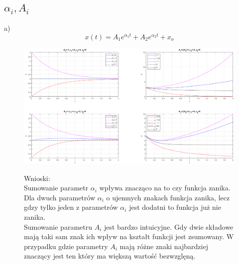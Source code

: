 \documentclass{article}
\begin{document}
\subsection{$\alpha_i,A_i$}
a)
$$
x(t)=A_1e^{\alpha_1 t}+A_2e^{\alpha_2 t} + x_o
$$
\begin{figure}[h]
    \centering
    \includegraphics[width=1.15\textwidth]{c_graphs_wersja2.png}
    \label{fig:my_label}
\end{figure}
\begin{figure}[h!]
\begin{flushleft}
Wnioski:\\
Sumowanie parametr $\alpha_i$ wpływa znacząco na to czy funkcja zanika. Dla dwuch parametrów $\alpha_i$ o ujemnych znakach funkcja zanika, lecz gdzy tylko jeden z parametrów $\alpha_i$ jest dodatni to funkcja już nie zanika. \\
Sumowanie parametru $A_i$ jest bardzo intuicyjne. Gdy dwie składowe mają taki sam znak ich wpływ na kształt funkcji jest zsumowany. W przypadku gdzie parametry $A_i$ mają różne znaki najbardziej znaczący jest ten który ma większą wartość bezwzglęną.  \\
\end{flushleft}
\end{figure}
\end{document}
